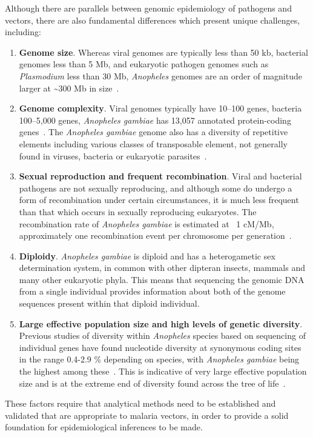 \begin{refsection}
Although there are parallels between genomic epidemiology of pathogens and vectors, there are also fundamental differences which present unique challenges, including:
%
\begin{enumerate}
%
\item \textbf{Genome size}.
%
Whereas viral genomes are typically less than 50 kb, bacterial genomes less than 5 Mb, and eukaryotic pathogen genomes such as \textit{Plasmodium} less than 30 Mb, \textit{Anopheles} genomes are an order of magnitude larger at \textasciitilde 300 Mb in size~\parencite{Neafsey2015}.
%
\item \textbf{Genome complexity}.
%
Viral genomes typically have 10--100 genes, bacteria 100--5,000 genes, \textit{Anopheles gambiae} has 13,057 annotated protein-coding genes~\parencite{AgamP4.12,GiraldoCalderon2015}.
%
The \textit{Anopheles gambiae} genome also has a diversity of repetitive elements including various classes of transposable element, not generally found in viruses, bacteria or eukaryotic parasites~\parencite{Tu2004,FernandezMedina2011}.
%
\item \textbf{Sexual reproduction and frequent recombination}.
%
Viral and bacterial pathogens are not sexually reproducing, and although some do undergo a form of recombination under certain circumstances, it is much less frequent than that which occurs in sexually reproducing eukaryotes.
%
The recombination rate of \textit{Anopheles gambiae} is estimated at ~1 cM/Mb, approximately one recombination event per chromosome per generation~\parencite{Pombi2006}.
%
\item \textbf{Diploidy}.
%
\textit{Anopheles gambiae} is diploid and has a heterogametic sex determination system, in common with other dipteran insects, mammals and many other eukaryotic phyla.
%
This means that sequencing the genomic DNA from a single individual provides information about both of the genome sequences present within that diploid individual.
%
\item \textbf{Large effective population size and high levels of genetic diversity}.
%
Previous studies of diversity within \textit{Anopheles} species based on sequencing of individual genes have found nucleotide diversity at synonymous coding sites in the range 0.4-2.9 \% depending on species, with \textit{Anopheles gambiae} being the highest among these~\parencite{Leffler2012}.
%
This is indicative of very large effective population size and is at the extreme end of diversity found across the tree of life~\parencite{Leffler2012}.
%
\end{enumerate}
%
These factors require that analytical methods need to be established and validated that are appropriate to malaria vectors, in order to provide a solid foundation for epidemiological inferences to be made.



\end{refsection}
